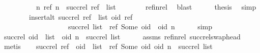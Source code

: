 \begin{isabellebody}
\ \ \isamarkupfalse%
\ {\isacharminus}\isanewline
\ \ \ \ \isamarkupfalse%
\ {\isachardoublequoteopen}{\isasymexists}n{\isachardot}\ {\isacharparenleft}ref{\isacharcomma}\ n{\isacharparenright}\ {\isasymin}\ succ{\isacharunderscore}rel\ {\isacharparenleft}ref\ {\isacharhash}\ list{\isacharparenright}{\isachardoublequoteclose}\isanewline
\ \ \ \ \ \ \isamarkupfalse%
\ ref{\isacharunderscore}in{\isacharunderscore}rel\ \isamarkupfalse%
\ blast\isanewline
\ \ \ \ \isamarkupfalse%
\ {\isacharquery}thesis\ \isamarkupfalse%
\ simp\isanewline
\ \ \isamarkupfalse%
\isanewline
\ \ \isamarkupfalse%
\ \isamarkupfalse%
\ {\isachardoublequoteopen}insert{\isacharunderscore}alt\ {\isacharparenleft}succ{\isacharunderscore}rel\ {\isacharparenleft}ref\ {\isacharhash}\ list{\isacharparenright}{\isacharparenright}\ {\isacharparenleft}oid{\isacharcomma}\ ref{\isacharparenright}\ {\isacharequal}\isanewline
\ \ \ \ \ \ \ \ \ \ \ \ \ \ \ \ \ \ \ succ{\isacharunderscore}rel\ list\ {\isasymunion}\ {\isacharbraceleft}{\isacharparenleft}ref{\isacharcomma}\ Some\ oid{\isacharparenright}{\isacharbraceright}\ {\isasymunion}\ {\isacharbraceleft}{\isacharparenleft}oid{\isacharcomma}\ n{\isacharparenright}{\isacharbraceright}{\isachardoublequoteclose}\isanewline
\ \ \ \ \isamarkupfalse%
\ simp\isanewline
\ \ \isamarkupfalse%
\ \isamarkupfalse%
\ {\isachardoublequoteopen}succ{\isacharunderscore}rel\ {\isacharparenleft}oid\ {\isacharhash}\ list{\isacharparenright}\ {\isacharequal}\ {\isacharbraceleft}{\isacharparenleft}oid{\isacharcomma}\ n{\isacharparenright}{\isacharbraceright}\ {\isasymunion}\ succ{\isacharunderscore}rel\ list{\isachardoublequoteclose}\isanewline
\ \ \ \ \isamarkupfalse%
\ assms\ ref{\isacharunderscore}in{\isacharunderscore}rel\ succ{\isacharunderscore}rel{\isacharunderscore}swap{\isacharunderscore}head\ \isamarkupfalse%
\ metis\isanewline
\ \ \isamarkupfalse%
\ {\isachardoublequoteopen}succ{\isacharunderscore}rel\ {\isacharparenleft}ref\ {\isacharhash}\ oid\ {\isacharhash}\ list{\isacharparenright}\ {\isacharequal}\ {\isacharbraceleft}{\isacharparenleft}ref{\isacharcomma}\ Some\ oid{\isacharparenright}{\isacharcomma}\ {\isacharparenleft}oid{\isacharcomma}\ n{\isacharparenright}{\isacharbraceright}\ {\isasymunion}\ succ{\isacharunderscore}rel\ list{\isachardoublequoteclose}\isanewline
\ \ \ \ \isamarkupfalse%

\end{isabellebody}

